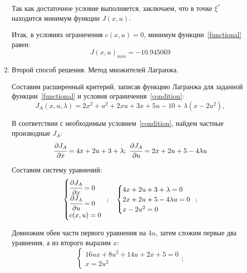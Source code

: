 \begin{enumerate}
	Так как достаточное условие выполняется, заключаем, что в точке $\xi^*$ находится минимум функции $J(x, u)$.	
	
	Итак, в условиях ограничения $c(x, u) = 0$, минимум функции~\eqref{functional} равен:
	\begin{equation}
		J(x, u)_{min} = - 10.945069 
	\end{equation}

	\item Второй способ решения. Метод множителей Лагранжа.
	
	Составим расширенный критерий, записав функцию Лагранжа для заданной функции~\eqref{functional} и условия ограничения~\eqref{condition}:
	\begin{equation}\label{l_func}
		J_A(x,u,\lambda) = 2 x^2 + u^2 + 2 x u + 3 x + 5 u - 10 + \lambda (x - 2 u^2),
	\end{equation}
	
	В соответствии с необходимым условием~\eqref{condition}, найдем частные производные $J_A$:
	\begin{equation}
		\cfrac{\partial J_A}{\partial x} = 4 x + 2 u + 3 + \lambda;~\cfrac{\partial J_A}{\partial u} = 2 x + 2 u + 5 - 4 \lambda u
	\end{equation}
	
	Составим систему уравнений:
	\begin{gather}\label{nonsolving_system}
		\begin{cases}
			\cfrac{\partial J_A}{\partial x} = 0 \\
			\cfrac{\partial J_A}{\partial u} = 0 \\
			c(x, u) = 0
		\end{cases}\!\!\!;~~~
		\begin{cases}
			4 x + 2 u + 3 + \lambda = 0 \\
			2 x + 2 u + 5 - 4 \lambda u = 0 \\
			x - 2 u^2 = 0
		\end{cases}\!\!\!; \\
	\end{gather}
	
	Домножим обеи части первого уравнения на $4 u$, затем сложим первые два уравнения, а из второго выразим $x$: 
	\begin{equation}
		\begin{cases}
			16 u x + 8 u^2 + 14 u + 2 x + 5 = 0\\
			x = 2 u^2
		\end{cases}\!\!\!;
	\end{equation}	
	

\end{enumerate}
